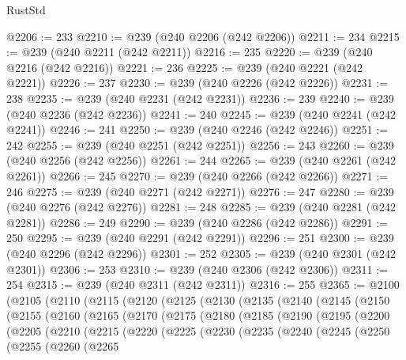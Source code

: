 \begin{lexlean}{RustStd}
\begin{coremodule}
@2206 := 233
@2210 := @239 (@240 @2206 (@242 @2206))
@2211 := 234
@2215 := @239 (@240 @2211 (@242 @2211))
@2216 := 235
@2220 := @239 (@240 @2216 (@242 @2216))
@2221 := 236
@2225 := @239 (@240 @2221 (@242 @2221))
@2226 := 237
@2230 := @239 (@240 @2226 (@242 @2226))
@2231 := 238
@2235 := @239 (@240 @2231 (@242 @2231))
@2236 := 239
@2240 := @239 (@240 @2236 (@242 @2236))
@2241 := 240
@2245 := @239 (@240 @2241 (@242 @2241))
@2246 := 241
@2250 := @239 (@240 @2246 (@242 @2246))
@2251 := 242
@2255 := @239 (@240 @2251 (@242 @2251))
@2256 := 243
@2260 := @239 (@240 @2256 (@242 @2256))
@2261 := 244
@2265 := @239 (@240 @2261 (@242 @2261))
@2266 := 245
@2270 := @239 (@240 @2266 (@242 @2266))
@2271 := 246
@2275 := @239 (@240 @2271 (@242 @2271))
@2276 := 247
@2280 := @239 (@240 @2276 (@242 @2276))
@2281 := 248
@2285 := @239 (@240 @2281 (@242 @2281))
@2286 := 249
@2290 := @239 (@240 @2286 (@242 @2286))
@2291 := 250
@2295 := @239 (@240 @2291 (@242 @2291))
@2296 := 251
@2300 := @239 (@240 @2296 (@242 @2296))
@2301 := 252
@2305 := @239 (@240 @2301 (@242 @2301))
@2306 := 253
@2310 := @239 (@240 @2306 (@242 @2306))
@2311 := 254
@2315 := @239 (@240 @2311 (@242 @2311))
@2316 := 255
@2365 := @2100
    (@2105
      (@2110
        (@2115
          (@2120
            (@2125
              (@2130
                (@2135
                  (@2140
                    (@2145
                      (@2150
                        (@2155
                          (@2160
                            (@2165
                              (@2170
                                (@2175
                                  (@2180
                                    (@2185
                                      (@2190
                                        (@2195
                                          (@2200
                                            (@2205
                                              (@2210
                                                (@2215
                                                  (@2220
                                                    (@2225
                                                      (@2230
                                                        (@2235
                                                          (@2240
                                                            (@2245
                                                              (@2250
                                                                (@2255
                                                                  (@2260
                                                                    (@2265

\end{coremodule}
\end{lexlean}
